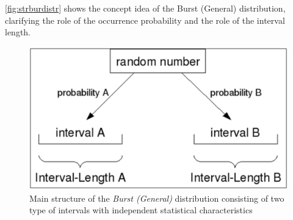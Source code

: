 \autoref{fig:strburdistr} shows the concept idea of the Burst
(General) distribution, clarifying the role of the occurrence
probability and the role of the interval length.
\begin{figure}[htb]
    \begin{center}
        \includegraphics[scale=.5]{img/jsimg/4.1.eps}
    \end{center}
    \caption{Main structure of the \emph{Burst (General)} distribution consisting
    of two type of intervals with independent statistical characteristics}
    \label{fig:strburdistr}
\end{figure}\\

